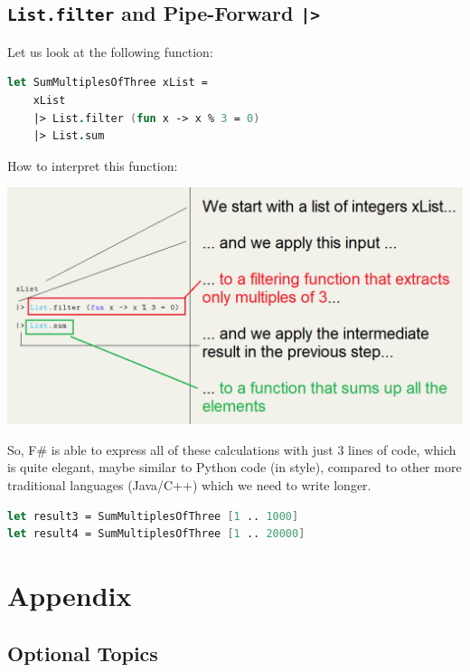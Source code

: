 \documentclass[12pt]{article}
\begin{document}
\subsection{\texttt{List.filter} and Pipe-Forward \texttt{|>}}
Let us look at the following function:
\begin{lstlisting}[language=FSharp]
let SumMultiplesOfThree xList =
    xList
    |> List.filter (fun x -> x % 3 = 0)
    |> List.sum
\end{lstlisting}
How to interpret this function:
\begin{center}
\includegraphics[width=16cm]{pictures/picture26.png}
\end{center}
So, F\# is able to express all of these calculations with just 3 lines of code, which is quite elegant, maybe similar to Python code (in style), compared to other more traditional languages (Java/C++) which we need to write longer.

\begin{lstlisting}[language=FSharp]
let result3 = SumMultiplesOfThree [1 .. 1000]
let result4 = SumMultiplesOfThree [1 .. 20000]
\end{lstlisting}













\pagebreak

\appendix
\section{Appendix}

\subsection{Optional Topics}
\end{document}
